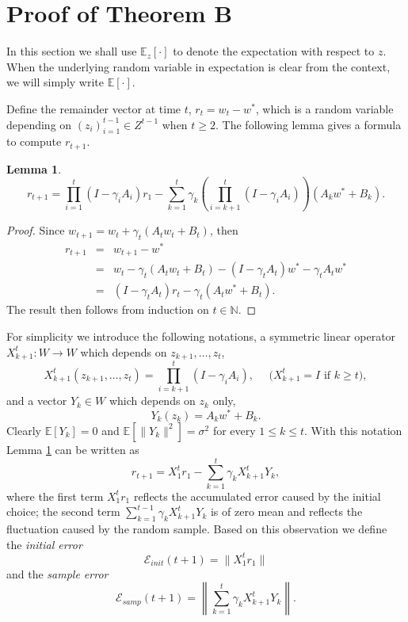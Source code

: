 \documentclass[twoside]{amsart}
\theoremstyle{theorem}
\newtheorem{lem}[thm]{Lemma}
\theoremstyle{definition}
\theoremstyle{remark}
\def\Err{{\mathscr E}}
\def\N{{\mathbb N}}
\def\E{{\mathbb E}}        %
\begin{document}

\section{Proof of Theorem B} \label{sec:pfs}


In this section we shall use $\E_{z}[\cdot]$ to denote the expectation with respect to $z$. When the underlying random variable
in expectation is clear from the context, we will simply write $\E[\cdot]$.

Define the remainder vector at time $t$, $r_t = w_t - w^\ast$, which is a
random variable depending on $(z_i)_{i=1}^{t-1}\in Z^{t-1}$ when $t\geq 2$.
The following lemma gives a formula to compute $r_{t+1}$.

\begin{lem}\label{lem:rt}
\[ r_{t+1} = \prod_{i=1}^t (I-\gamma_i A_i) r_1 - \sum_{k=1}^{t}\gamma_k  \left(\prod_{i=k+1}^t (I-\gamma_i A_i) \right)(A_k w^\ast + B_k). \]
\end{lem}
\begin{proof} Since $w_{t+1}=w_t + \gamma_t (A_t w_t + B_t)$, then
\begin{eqnarray*}
r_{t+1} & = & w_{t+1}- w^\ast \\
& = & w_t - \gamma_t (A_t w_t + B_t) - (I-\gamma_t A_t) w^\ast - \gamma_t A_t w^\ast \\
& = & (I-\gamma_t A_t) r_t - \gamma_t (A_t w^\ast + B_t).
\end{eqnarray*}
The result then follows from induction on $t\in \N$.
\end{proof}

For simplicity we introduce the following notations, a symmetric linear operator $X_{k+1}^t: W\to W$ which
depends on $z_{k+1},\ldots,z_t$,
\[ X_{k+1}^t (z_{k+1},\ldots,z_t) = \prod_{i=k+1}^t (I-\gamma_i A_i), \ \ \ \ \ \ \mbox{($X_{k+1}^t=I$ if $k\geq t$)},  \]
and a vector $Y_k\in W$ which depends on $z_k$ only,
\[ Y_k(z_k) = A_k w^\ast + B_k. \]
Clearly $\E[Y_k]=0$ and $\E[\|Y_k\|^2]=\sigma^2$ for every $1\leq k\leq t$.
With this notation Lemma \ref{lem:rt} can be written as
\begin{equation} \label{eq:easy-rt}
r_{t+1}=X_1^t r_1 - \sum_{k=1}^{t} \gamma_k X_{k+1}^t Y_k,
\end{equation}
where the first term $X_1^t r_1$ reflects the accumulated error caused by the initial choice;
the second term $\sum_{k=1}^{t-1}\gamma_k X_{k+1}^tY_k$ is of zero mean and reflects the fluctuation
caused by the random sample. Based on this observation we define the \emph{initial error}
\begin{equation} \label{eq:init}
 \Err_{init}(t+1) = \| X_1^t r_1 \|
\end{equation}
and the \emph{sample error}
\begin{equation} \label{eq:samp}
\Err_{samp}(t+1) = \left\| \sum_{k=1}^{t} \gamma_k X_{k+1}^t Y_k \right\|.
\end{equation}
\end{document}
